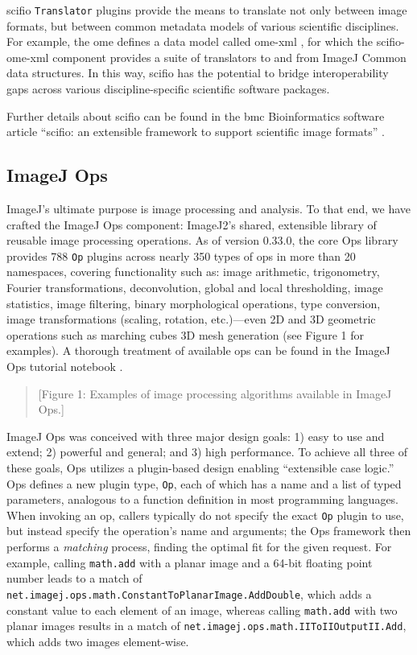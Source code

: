 \documentclass{bmcart}
\begin{document}
\acrshort{scifio} \texttt{Translator} plugins provide the means to translate
not only between image formats, but between common metadata models of various
scientific disciplines. For example, the \acrfull{ome} defines a data model
called \acrshort{ome}-\acrshort{xml} \cite{ome_xml}, for which the
\acrshort{scifio}-\acrshort{ome}-\acrshort{xml} component provides a suite of
translators to and from ImageJ Common data structures. In this way,
\acrshort{scifio} has the potential to bridge interoperability gaps across
various discipline-specific scientific software packages.

Further details about \acrshort{scifio} can be found in the \acrfull{bmc}
Bioinformatics software article ``\acrshort{scifio}: an extensible framework to
support scientific image formats'' \cite{scifio}.

\subsection*{ImageJ Ops}

ImageJ's ultimate purpose is image processing and analysis. To that end, we
have crafted the ImageJ Ops component: ImageJ2's shared, extensible library of
reusable image processing operations. As of version 0.33.0, the core Ops
library provides 788 \texttt{Op} plugins across nearly 350 types of ops in more
than 20 namespaces, covering functionality such as: image arithmetic,
trigonometry, Fourier transformations, deconvolution, global and local
thresholding, image statistics, image filtering, binary morphological
operations, type conversion, image transformations (scaling, rotation,
etc.)---even 2D and 3D geometric operations such as marching cubes 3D mesh
generation (see Figure 1 for examples). A thorough treatment of available ops
can be found in the ImageJ Ops tutorial notebook \cite{imagej_notebooks}.

\begin{quote}
[Figure 1: Examples of image processing algorithms available in ImageJ Ops.]
\end{quote}

ImageJ Ops was conceived with three major design goals: 1) easy to use and
extend; 2) powerful and general; and 3) high performance. To achieve all three
of these goals, Ops utilizes a plugin-based design enabling ``extensible case
logic.'' Ops defines a new plugin type, \texttt{Op}, each of which has a name
and a list of typed parameters, analogous to a function definition in most
programming languages. When invoking an op, callers typically do not specify
the exact \texttt{Op} plugin to use, but instead specify the operation's name
and arguments; the Ops framework then performs a \textit{matching} process,
finding the optimal fit for the given request. For example, calling
\texttt{math.add} with a planar image and a 64-bit floating point number leads
to a match of \texttt{net.imagej.ops.math.ConstantToPlanarImage.AddDouble},
which adds a constant value to each element of an image, whereas calling
\texttt{math.add} with two planar images results in a match of
\texttt{net.imagej.ops.math.IIToIIOutputII.Add}, which adds two images
element-wise.
\end{document}
